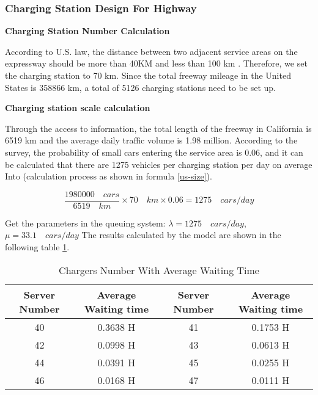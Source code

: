 \documentclass{mcmthesis}
\begin{document}
\subsubsection{Charging Station Design For Highway}

\textbf{Charging Station Number Calculation}

\par According to U.S. law, the distance between two adjacent service areas on the expressway should be more than 40KM and less than 100 km . Therefore, we set the charging station to 70 km. Since the total freeway mileage in the United States is 358866 km, a total of 5126 charging stations need to be set up.


\textbf{Charging station scale calculation}

Through the access to information, the total length of the freeway in California is 6519 km and the average daily traffic volume is 1.98 million. According to the survey, the probability of small cars entering the service area is 0.06, and it can be calculated that there are 1275 vehicles per charging station per day on average Into (calculation process as shown in formula \ref{us-size}).

\begin{equation}
	\label{us-size}
	\frac{1980000 \quad cars} {6519 \quad km} \times 70 \quad km \times 0.06 = 1275 \quad cars/day
\end{equation}

Get the parameters in the queuing system: $ \lambda = 1275 \quad cars/day $,$\mu = 33.1 \quad cars/day$ The results calculated by the model are shown in the following table \ref{tab:Charging pile Number With Average Waiting Time}.



\begin{table}[h]
\centering
\caption{Chargers Number With Average Waiting Time}\label{tab:Charging pile Number With Average Waiting Time}
\begin{tabular}{cc|cc}
\toprule
  Server Number & Average Waiting time &  Server Number & Average Waiting time \\
\midrule
40 & 0.3638 H & 41 & 0.1753 H \\
42 & 0.0998 H & 43 & 0.0613 H \\
44 & 0.0391 H & 45 & 0.0255 H \\
46 & 0.0168 H & 47 & 0.0111 H \\
\bottomrule
\end{tabular}
\end{table}
\end{document}
